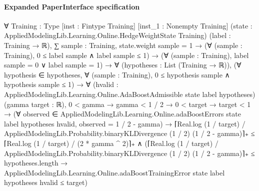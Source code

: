\documentclass[10pt]{article}
\begin{document}
\paragraph{Expanded PaperInterface specification}
\begin{ReviewVerbatim}
∀ {Training : Type} [inst : Fintype Training] [inst_1 : Nonempty Training]
  (state : AppliedModelingLib.Learning.Online.HedgeWeightState Training) (label : Training → ℝ),
  ∑ sample : Training, state.weight sample = 1 →
    (∀ (sample : Training), 0 ≤ label sample ∧ label sample ≤ 1) →
      (∀ (sample : Training), label sample = 0 ∨ label sample = 1) →
        ∀ (hypotheses : List (Training → ℝ)),
          (∀ hypothesis ∈ hypotheses, ∀ (sample : Training), 0 ≤ hypothesis sample ∧ hypothesis sample ≤ 1) →
            ∀ (hvalid : AppliedModelingLib.Learning.Online.AdaBoostAdmissible state label hypotheses)
              (gamma target : ℝ),
              0 < gamma →
                gamma < 1 / 2 →
                  0 < target →
                    target < 1 →
                      (∀ observed ∈ AppliedModelingLib.Learning.Online.adaBoostErrors state label hypotheses hvalid,
                          observed = 1 / 2 - gamma) →
                        ⌈Real.log (1 / target) /
                                AppliedModelingLib.Probability.binaryKLDivergence (1 / 2) (1 / 2 - gamma)⌉₊ ≤
                            ⌈Real.log (1 / target) / (2 * gamma ^ 2)⌉₊ ∧
                          (⌈Real.log (1 / target) /
                                  AppliedModelingLib.Probability.binaryKLDivergence (1 / 2) (1 / 2 - gamma)⌉₊ ≤
                              hypotheses.length →
                            AppliedModelingLib.Learning.Online.adaBoostTrainingError state label hypotheses hvalid ≤
                              target)
\end{ReviewVerbatim}
\end{document}
